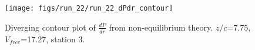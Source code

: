 \begin{figure}[H]
\centering
\texttt{[image: figs/run\_22/run\_22\_dPdr\_contour]}
\caption{Diverging contour plot of $\frac{d\bar{P}}{dr}$ from non-equilibrium theory. $z/c$=7.75, $V_{free}$=17.27, station 3.}
\label{fig:run_22_dPdr_contour}
\end{figure}


